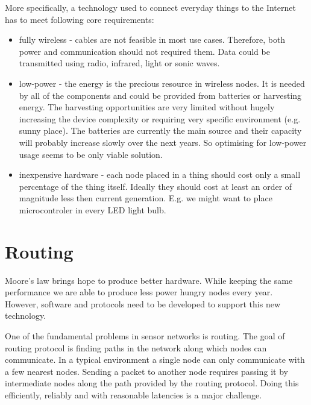 More specifically, a technology used to connect everyday things to the Internet has to meet following core requirements:
\begin{itemize}
  \item fully wireless - cables are not feasible in most use cases. Therefore, both power and communication should not required them. Data could be transmitted using radio, infrared, light or sonic waves.
  \item low-power - the energy is the precious resource in wireless nodes. It is needed by all of the components and could be provided from batteries or harvesting energy. The harvesting opportunities are very limited without hugely increasing the device complexity or requiring very specific environment (e.g. sunny place). The batteries are currently the main source and their capacity will probably increase slowly over the next years. So optimising for low-power usage seems to be only viable solution.
  \item inexpensive hardware - each node placed in a thing should cost only a small percentage of the thing itself. Ideally they should cost at least an order of magnitude less then current generation. E.g. we might want to place microcontroler in every LED light bulb.
\end{itemize}

\section{Routing}
Moore's law brings hope to produce better hardware. While keeping the same performance we are able to produce less power hungry nodes every year. However, software and protocols need to be developed to support this new technology.

One of the fundamental problems in sensor networks is routing. The goal of routing protocol is finding paths in the network along which nodes can communicate.
In a typical environment a single node can only communicate with a few nearest nodes. Sending a packet to another node requires passing it by intermediate nodes along the path provided by the routing protocol. Doing this efficiently, reliably and with reasonable latencies is a major challenge.

